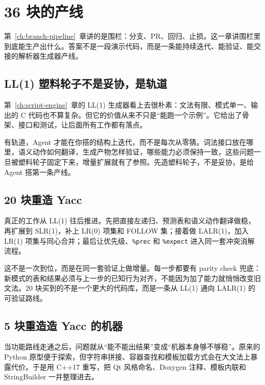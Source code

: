 \chapter{36 块的产线}
\label{ch:parser-production-line}

第~\ref{ch:branch-pipeline}~章讲的是围栏：分支、PR、回归、止损。这一章讲围栏里到底能生产出什么。答案不是一段演示代码，而是一条能持续迭代、能验证、能交接的解析器生成器产线。

\section{LL(1) 塑料轮子不是妥协，是轨道}

第~\ref{ch:script-engine}~章的 LL(1) 生成器看上去很朴素：文法有限、模式单一、输出的 C 代码也不算复杂。但它的价值从来不只是“能跑一个示例”。它给出了骨架、接口和测试，让后面所有工作都有落点。

有轨道，Agent 才能在你搭的结构上迭代，而不是每次从零猜。词法接口放在哪里，语义动作如何翻译，生成产物怎样验证，哪些能力必须保持一致，这些问题一旦被塑料轮子固定下来，增量扩展就有了参照。先造塑料轮子，不是妥协，是给 Agent 搭第一条产线。

\section{20 块重造 Yacc}

真正的工作从 LL(1) 往后推进。先把直接左递归、预测表和语义动作翻译做稳，再扩展到 SLR(1)，补上 LR(0) 项集和 FOLLOW 集；接着做 LALR(1)，加入 LR(1) 项集与同心合并；最后让优先级、\texttt{\%prec} 和 \texttt{\%expect} 进入同一套冲突消解流程。

这不是一次到位，而是在同一套验证上做增量。每一步都要有 parity check 兜底：新模式的表和结果必须与上一步的已知行为对齐，不能因为加了能力就悄悄改变旧文法。20 块买到的不是一个更大的代码库，而是一条从 LL(1) 通向 LALR(1) 的可验证路线。

\section{5 块重造造 Yacc 的机器}

当功能路线走通之后，问题就从“能不能出结果”变成“机器本身够不够稳”。原来的 Python 原型便于探索，但字符串拼接、容器查找和模板加载方式会在大文法上暴露代价。于是用 C++17 重写，把 Qt 风格命名、Doxygen 注释、模板内联和 StringBuilder 一并整理进去。

